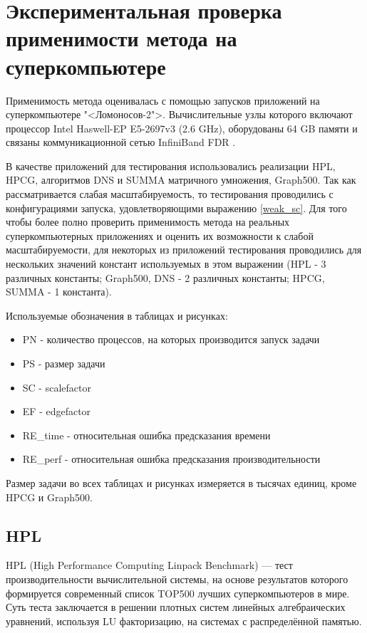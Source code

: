 \section{Экспериментальная проверка применимости метода на суперкомпьютере}
	Применимость метода оценивалась с помощью запусков приложений на суперкомпьютере "<Ломоносов-2">. Вычислительные узлы которого включают процессор Intel Haswell-EP E5-2697v3 (2.6 GHz), оборудованы 64 GB памяти и связаны коммуникационной сетью InfiniBand FDR \cite{Lom2_stat}.

	В качестве приложений для тестирования использовались реализации HPL, HPCG, алгоритмов DNS и SUMMA матричного умножения, Graph500. Так как рассматривается слабая масштабируемость, то тестирования проводились с конфигурациями запуска, удовлетворяющими выражению \eqref{weak_sc}. Для того чтобы более полно проверить применимость метода на реальных суперкомпьютерных приложениях и оценить их возможности к слабой масштабируемости, для некоторых из приложений тестирования проводились для нескольких значений констант используемых в этом выражении (HPL - 3 различных константы; Graph500, DNS - 2 различных константы; HPCG, SUMMA - 1 константа).

	Используемые обозначения в таблицах и рисунках:
	\begin{itemize}
		\item PN - количество процессов, на которых производится запуск задачи
		\item PS - размер задачи
		\item SC - scalefactor
		\item EF - edgefactor
		\item RE\_time - относительная ошибка предсказания времени
		\item RE\_perf - относительная ошибка предсказания производительности
	\end{itemize}
	Размер задачи во всех таблицах и рисунках измеряется в тысячах единиц, кроме HPCG и Graph500.

	\subsection{HPL}
	HPL (High Performance Computing Linpack Benchmark) — тест производительности вычислительной системы, на основе результатов которого формируется современный список TOP500 \cite{top500} лучших суперкомпьютеров в мире. Суть теста заключается в решении плотных систем линейных алгебраических уравнений, используя LU факторизацию, на системах с распределённой памятью.

